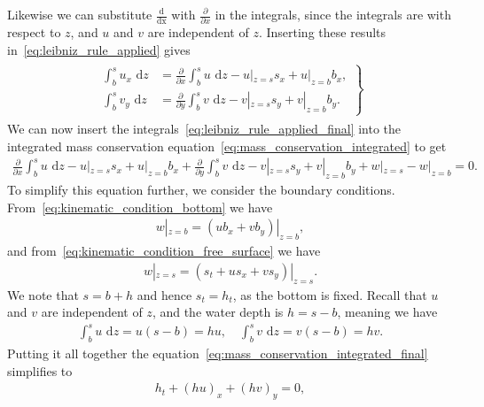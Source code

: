 Likewise we can substitute $\frac{\text{d}}{\text{dx}}$ with $\frac{\partial}{\partial x}$ in the integrals, since the integrals are with respect to $z$, and $u$ and $v$ are independent of $z$.
Inserting these results in~\eqref{eq:leibniz_rule_applied} gives
\begin{align}\label{eq:leibniz_rule_applied_final}
    \begin{gathered}
        \left.
            \begin{aligned}
                \int_{b}^{s} u_x \text{ d} z &=  \frac{\partial}{\partial x}  \int_{b}^{s} u \text{ d} z  - u|_{z = s} s_x + u|_{z = b} b_x, \\
                \int_{b}^{s} v_y \text{ d} z &= \frac{\partial}{\partial y}  \int_{b}^{s} v \text{ d} z  - v|_{z = s} s_y + v|_{z = b} b_y.
            \end{aligned}
        \right\}
    \end{gathered}
\end{align}
We can now insert the integrals~\eqref{eq:leibniz_rule_applied_final} into the integrated mass conservation equation~\eqref{eq:mass_conservation_integrated} to get
\begin{align}\label{eq:mass_conservation_integrated_final}
    \frac{\partial}{\partial x}  \int_{b}^{s} u \text{ d} z  - u|_{z = s} s_x + u|_{z = b} b_x
    + \frac{\partial}{\partial y}  \int_{b}^{s} v \text{ d} z  - v|_{z = s} s_y + v|_{z = b} b_y
    + w|_{z = s} - w|_{z = b} = 0.
\end{align}
To simplify this equation further, we consider the boundary conditions.
From~\eqref{eq:kinematic_condition_bottom} we have
\begin{align}
    w|_{z = b} = (u b_x + v b_y)|_{z = b},
\end{align}
and from~\eqref{eq:kinematic_condition_free_surface} we have
\begin{align}
    w|_{z = s} = (s_t + u s_x + v s_y)|_{z = s}.
\end{align}
We note that $s = b + h$ and hence $s_t = h_t$, as the bottom is fixed.
Recall that $u$ and $v$ are independent of $z$, and the water depth is $h = s - b$, meaning we have
\begin{align*}
    \int_{b}^{s} u \text{ d} z = u(s - b) = hu, \quad \int_{b}^{s} v \text{ d} z = v(s - b) = hv.
\end{align*}
Putting it all together the equation~\eqref{eq:mass_conservation_integrated_final} simplifies to
\begin{align}\label{eq:SWE_1}
    h_t + {(hu)}_x + {(hv)}_y = 0,
\end{align}
